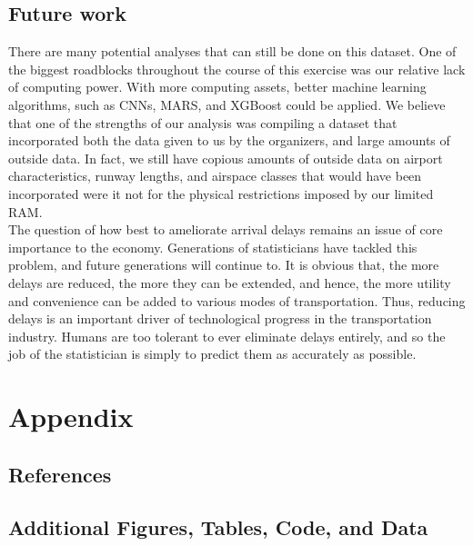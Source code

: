 \documentclass[12pt, a4paper]{book}
\newcommand\tab[1][1cm]{\hspace*{#1}}
\begin{document}
	\section{Future work}
	\tab There are many potential analyses that can still be done on this dataset. One of the biggest roadblocks throughout the course of this exercise was our relative lack of computing power. With more computing assets, better machine learning algorithms, such as CNNs, MARS, and XGBoost could be applied. We believe that one of the strengths of our analysis was compiling a dataset that incorporated both the data given to us by the organizers, and large amounts of outside data. In fact, we still have copious amounts of outside data on airport characteristics, runway lengths, and airspace classes that would have been incorporated were it not for the physical restrictions imposed by our limited RAM. \\
	\tab The question of how best to ameliorate arrival delays remains an issue of core importance to the economy. Generations of statisticians have tackled this problem, and future generations will continue to. It is obvious that, the more delays are reduced, the more they can be extended, and hence, the more utility and convenience can be added to various modes of transportation. Thus, reducing delays is an important driver of technological progress in the transportation industry. Humans are too tolerant to ever eliminate delays entirely, and so the job of the statistician is simply to predict them as accurately as possible. 
\chapter{Appendix}
	\section{References}
	\section{Additional Figures, Tables, Code, and Data}
\pagebreak


\nocite{*}

\end{document}
